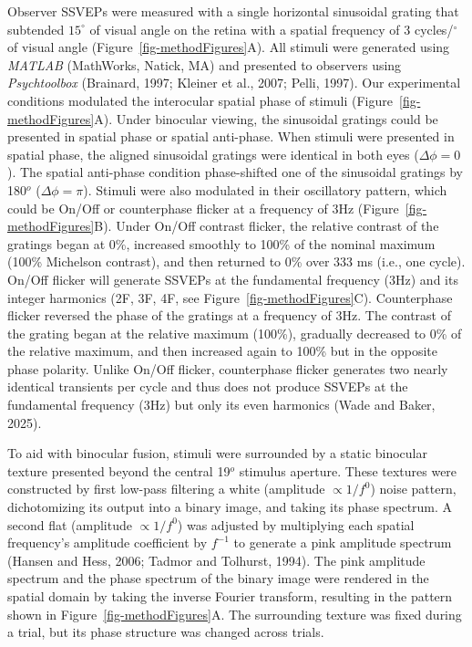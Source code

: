 \documentclass[
  12pt,
]{article}
\begin{document}
Observer SSVEPs were measured with a single horizontal sinusoidal
grating that subtended \(15^\circ\) of visual angle on the retina with a
spatial frequency of 3 cycles/\(^\circ\) of visual angle
(Figure~\ref{fig-methodFigures}A). All stimuli were generated using
\textit{MATLAB} (MathWorks, Natick, MA) and presented to observers using
\textit{Psychtoolbox} (Brainard, 1997; Kleiner et al., 2007; Pelli,
1997). Our experimental conditions modulated the interocular spatial
phase of stimuli (Figure~\ref{fig-methodFigures}A). Under binocular
viewing, the sinusoidal gratings could be presented in spatial phase or
spatial anti-phase. When stimuli were presented in spatial phase, the
aligned sinusoidal gratings were identical in both eyes
(\(\Delta \phi = 0\)). The spatial anti-phase condition phase-shifted
one of the sinusoidal gratings by 180\(^o\) (\(\Delta \phi = \pi\)).
Stimuli were also modulated in their oscillatory pattern, which could be
On/Off or counterphase flicker at a frequency of 3Hz
(Figure~\ref{fig-methodFigures}B). Under On/Off contrast flicker, the
relative contrast of the gratings began at 0\%, increased smoothly to
100\% of the nominal maximum (100\% Michelson contrast), and then
returned to 0\% over 333 ms (i.e., one cycle). On/Off flicker will
generate SSVEPs at the fundamental frequency (3Hz) and its integer
harmonics (2F, 3F, 4F, see Figure~\ref{fig-methodFigures}C).
Counterphase flicker reversed the phase of the gratings at a frequency
of 3Hz. The contrast of the grating began at the relative maximum
(100\%), gradually decreased to 0\% of the relative maximum, and then
increased again to 100\% but in the opposite phase polarity. Unlike
On/Off flicker, counterphase flicker generates two nearly identical
transients per cycle and thus does not produce SSVEPs at the fundamental
frequency (3Hz) but only its even harmonics (Wade and Baker, 2025).

To aid with binocular fusion, stimuli were surrounded by a static
binocular texture presented beyond the central 19\(^o\) stimulus
aperture. These textures were constructed by first low-pass filtering a
white (amplitude \(\propto 1/f^0\)) noise pattern, dichotomizing its
output into a binary image, and taking its phase spectrum. A second flat
(amplitude \(\propto 1/f^0\)) was adjusted by multiplying each spatial
frequency's amplitude coefficient by \(f^{-1}\) to generate a pink
amplitude spectrum (Hansen and Hess, 2006; Tadmor and Tolhurst, 1994).
The pink amplitude spectrum and the phase spectrum of the binary image
were rendered in the spatial domain by taking the inverse Fourier
transform, resulting in the pattern shown in
Figure~\ref{fig-methodFigures}A. The surrounding texture was fixed
during a trial, but its phase structure was changed across trials.
\end{document}
